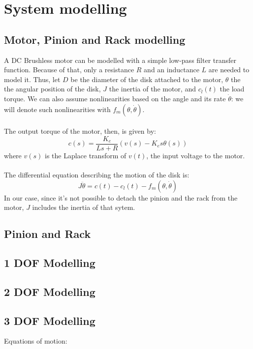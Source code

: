 
\part{System modelling}

\chapter{Motor, Pinion and Rack modelling} 
A DC Brushless motor can be modelled with a simple low-pass filter transfer function. Because of that, only a resistance $R$ and an inductance $L$ are needed to model it. Thus, let $D$ be the diameter of the disk attached to the motor, $\theta$ the the angular position of the disk, $J$ the inertia of the motor, and $c_{l}(t)$ the load torque. We can also assume nonlinearities based on the angle and its rate $\dot{\theta}$:  we will denote such nonlinearities with $f_{m}(\theta,\dot{\theta})$.\\ \\
 The output torque of the motor, then, is  given by:
$$c(s) = \frac{K_{e}}{Ls+R} (v(s)-K_{e}s \theta(s))$$
where $v(s)$ is the Laplace transform of $v(t)$, the input voltage to the motor.\\ \\
The differential equation describing the motion of the disk is:
$$J\ddot{\theta}=c(t)-c_{l}(t) -f_{m}(\theta,\dot{\theta})$$
In our case, since it's not possible to detach the pinion and the rack from the motor, $J$ includes the inertia of that sytem.

\chapter{Pinion and Rack}


\chapter{1 DOF Modelling}

\chapter{2 DOF Modelling}

\chapter{3 DOF Modelling}
Equations of motion:

